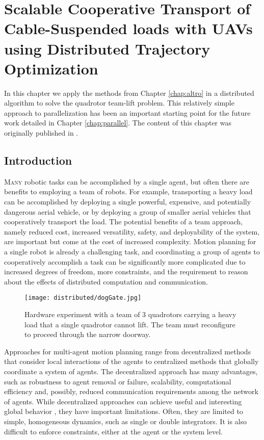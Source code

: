 \documentclass[../root.tex]{subfiles}
\begin{document}
\chapter{
    Scalable Cooperative Transport of Cable-Suspended loads with UAVs using
    Distributed Trajectory Optimization
} \label{chap:distributed}
In this chapter we apply the methods from Chapter \ref{chap:altro} in a
distributed algorithm to solve the quadrotor team-lift problem. This
relatively simple approach to parallelization has been an important starting
point for the future work detailed in Chapter \ref{chap:parallel}. 
The content of this chapter was originally published in 
\cite{jackson_Scalable_2020}.

\section{Introduction}
\lettrine{M}{any} robotic tasks can be accomplished by a single agent,
but often there are benefits to employing a team of robots. For example,
transporting a heavy load can be accomplished by deploying a single powerful,
expensive, and potentially dangerous aerial vehicle, or by deploying a group
of smaller aerial vehicles that cooperatively transport the load. The
potential benefits of a team approach, namely reduced cost, increased
versatility, safety, and deployability of the system, are important but come
at the cost of increased complexity. Motion planning for a single robot is
already a challenging task, and coordinating a group of agents to
cooperatively accomplish a task can be significantly more complicated due to
increased degrees of freedom, more constraints, and the requirement to reason
about the effects of distributed computation and communication.

\begin{figure}[t]
	\centering
	\texttt{[image: distributed/dogGate.jpg]}
	\caption{Hardware experiment with a team of 3 quadrotors carrying a heavy
	load that a single quadrotor cannot lift. The team must reconfigure to
	proceed through the narrow doorway.}
	\label{fig:x0_hardware}
\end{figure}

Approaches for multi-agent motion planning range from decentralized methods
that consider local interactions of the agents to centralized methods that
globally coordinate a system of agents. The decentralized approach has many
advantages, such as robustness to agent removal or failure, scalability,
computational efficiency and, possibly, reduced communication requirements
among the network of agents. While decentralized approaches can achieve
useful and interesting global behavior 
\cite{cortes_Coverage_2004,krick_Stabilisation_2009,olfati-saber_Consensus_2004,
pimenta_Sensing_2008,vandenberg_Reciprocal_2008},
they have important limitations. Often, they are limited
to simple, homogeneous dynamics, such as single or double integrators. It is
also difficult to enforce constraints, either at the agent or the system
level.
\end{document}
